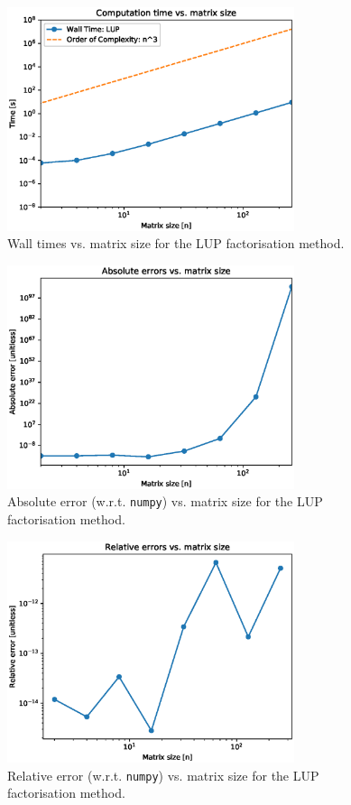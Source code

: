 \documentclass[11pt, oneside]{article}
\begin{document}
\begin{figure}[]
      \centering
      \includegraphics[width=0.75\textwidth]{figure/Figure_4.eps}
      \caption{Wall times vs. matrix size for the LUP factorisation method.}
      \label{fig:4}
\end{figure}
\begin{figure}[]
      \centering
      \includegraphics[width=0.75\textwidth]{figure/Figure_5.eps}
      \caption{Absolute error (w.r.t. \texttt{numpy})  vs. matrix size for the LUP factorisation method.}
      \label{fig:5}
\end{figure}
\begin{figure}[]
      \centering
      \includegraphics[width=0.75\textwidth]{figure/Figure_6.eps}
      \caption{Relative error (w.r.t. \texttt{numpy})  vs. matrix size for the LUP factorisation method.}
      \label{fig:6}
\end{figure}
\end{document}
